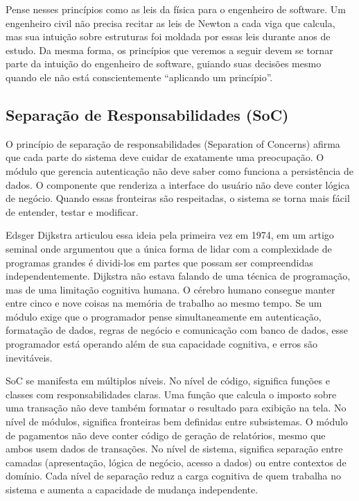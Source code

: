Pense nesses princípios como as leis da física para o engenheiro de software.
Um engenheiro civil não precisa recitar as leis de Newton a cada viga que calcula,
mas sua intuição sobre estruturas foi moldada por essas leis durante anos de
estudo. Da mesma forma, os princípios que veremos a seguir devem se tornar parte
da intuição do engenheiro de software, guiando suas decisões mesmo quando ele
não está conscientemente ``aplicando um princípio''.

\subsection{Separação de Responsabilidades (SoC)}

O princípio de separação de responsabilidades (Separation of Concerns) afirma
que cada parte do sistema deve cuidar de exatamente uma preocupação. O módulo
que gerencia autenticação não deve saber como funciona a persistência de dados.
O componente que renderiza a interface do usuário não deve conter lógica de
negócio. Quando essas fronteiras são respeitadas, o sistema se torna mais fácil
de entender, testar e modificar.

Edsger Dijkstra articulou essa ideia pela primeira vez em 1974, em um
artigo seminal onde argumentou que a única forma de lidar com a complexidade
de programas grandes é dividi-los em partes que possam ser compreendidas
independentemente. Dijkstra não estava falando de uma técnica de programação,
mas de uma limitação cognitiva humana. O cérebro humano consegue
manter entre cinco e nove coisas na memória de trabalho ao mesmo tempo. Se um
módulo exige que o programador pense simultaneamente em autenticação, formatação
de dados, regras de negócio e comunicação com banco de dados, esse programador
está operando além de sua capacidade cognitiva, e erros são inevitáveis.

SoC se manifesta em múltiplos níveis. No nível de código, significa
funções e classes com responsabilidades claras. Uma função que calcula o imposto
sobre uma transação não deve também formatar o resultado para exibição na tela.
No nível de módulos, significa fronteiras bem definidas entre subsistemas. O
módulo de pagamentos não deve conter código de geração de relatórios, mesmo que
ambos usem dados de transações. No nível de sistema, significa separação entre
camadas (apresentação, lógica de negócio, acesso a dados) ou entre contextos de
domínio. Cada nível de separação reduz a carga cognitiva de quem trabalha no
sistema e aumenta a capacidade de mudança independente.


